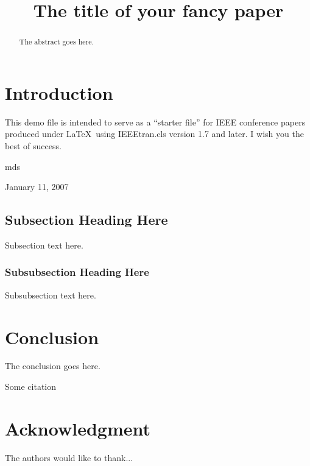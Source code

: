 \documentclass[conference]{IEEEtran}
\begin{document}
\title{The title of your fancy paper}

\author{
\and
{}
\and
{}
}

\maketitle


\begin{abstract}
The abstract goes here.
\end{abstract}

\section{Introduction}
This demo file is intended to serve as a ``starter file''
for IEEE conference papers produced under \LaTeX\ using
IEEEtran.cls version 1.7 and later.
I wish you the best of success.

\hfill mds
 
\hfill January 11, 2007

\subsection{Subsection Heading Here}
Subsection text here.


\subsubsection{Subsubsection Heading Here}
Subsubsection text here.

\section{Conclusion}
The conclusion goes here.

Some citation \cite{samuel59some}




\section*{Acknowledgment}


The authors would like to thank...




\end{document}
